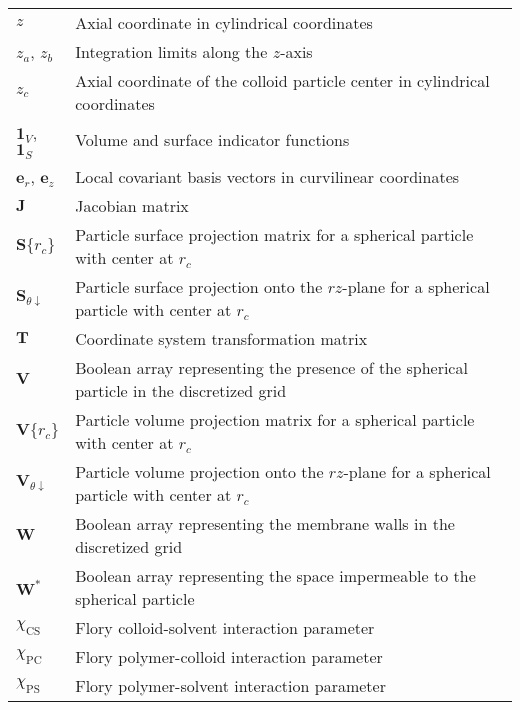 \documentclass[10pt, a4paper]{article}
\begin{document}
\begin{tabularx}{\linewidth}{l X}
    $z$ & Axial coordinate in cylindrical coordinates \\
    $z_a$, $z_b$ & Integration limits along the $z$-axis \\
    $z_{c}$ & Axial coordinate of the colloid particle center in cylindrical coordinates \\
    $\bm{1}_{V}$, $\bm{1}_{S}$ & Volume and surface indicator functions \\
    $\bm{e}_r$, $\bm{e}_z$ & Local covariant basis vectors in curvilinear coordinates \\
    $\bm{J}$ & Jacobian matrix \\
    $\bm{S}\{r_{c}\}$ & Particle surface projection matrix for a spherical particle with center at $r_{c}$ \\
    $\bm{S}_{\theta\downarrow}$ & Particle surface projection onto the $rz$-plane for a spherical particle with center at $r_{c}$ \\
    $\bm{T}$ & Coordinate system transformation matrix \\
    $\bm{V}$ & Boolean array representing the presence of the spherical particle in the discretized grid \\
    $\bm{V}\{r_{c}\}$ & Particle volume projection matrix for a spherical particle with center at $r_{c}$ \\
    $\bm{V}_{\theta\downarrow}$ & Particle volume projection onto the $rz$-plane for a spherical particle with center at $r_{c}$ \\
    $\bm{W}$ & Boolean array representing the membrane walls in the discretized grid \\
    $\bm{W}^{\ast}$ & Boolean array representing the space impermeable to the spherical particle \\
    $\chi_{\textrm{CS}}$ & Flory colloid-solvent interaction parameter \\
    $\chi_{\textrm{PC}}$ & Flory polymer-colloid interaction parameter \\
    $\chi_{\textrm{PS}}$ & Flory polymer-solvent interaction parameter \\
\end{tabularx}
\end{document}
